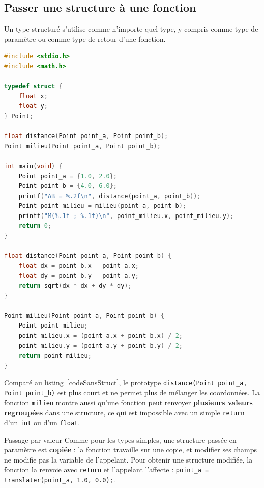 \subsection{Passer une structure à une fonction}

Un type structuré s'utilise comme n'importe quel type, y compris comme type de paramètre ou comme type de retour d'une fonction.

\begin{lstlisting}[language=c,caption={Fonctions sur des points},label=codeFonctionsPoint]
#include <stdio.h>
#include <math.h>

typedef struct {
    float x;
    float y;
} Point;

float distance(Point point_a, Point point_b);
Point milieu(Point point_a, Point point_b);

int main(void) {
    Point point_a = {1.0, 2.0};
    Point point_b = {4.0, 6.0};
    printf("AB = %.2f\n", distance(point_a, point_b));
    Point point_milieu = milieu(point_a, point_b);
    printf("M(%.1f ; %.1f)\n", point_milieu.x, point_milieu.y);
    return 0;
}

float distance(Point point_a, Point point_b) {
    float dx = point_b.x - point_a.x;
    float dy = point_b.y - point_a.y;
    return sqrt(dx * dx + dy * dy);
}

Point milieu(Point point_a, Point point_b) {
    Point point_milieu;
    point_milieu.x = (point_a.x + point_b.x) / 2;
    point_milieu.y = (point_a.y + point_b.y) / 2;
    return point_milieu;
}
\end{lstlisting}

Comparé au listing~\ref{codeSansStruct}, le prototype \texttt{distance(Point point\_a, Point point\_b)} est plus court et ne permet plus de mélanger les coordonnées. La fonction \texttt{milieu} montre aussi qu'une fonction peut renvoyer \textbf{plusieurs valeurs regroupées} dans une structure, ce qui est impossible avec un simple \texttt{return} d'un \texttt{int} ou d'un \texttt{float}.

\begin{UPSTIwarning}{Passage par valeur}
  Comme pour les types simples, une structure passée en paramètre est \textbf{copiée} : la fonction travaille sur une copie, et modifier ses champs ne modifie pas la variable de l'appelant. Pour obtenir une structure modifiée, la fonction la renvoie avec \texttt{return} et l'appelant l'affecte : \texttt{point\_a = translater(point\_a, 1.0, 0.0);}.
\end{UPSTIwarning}

